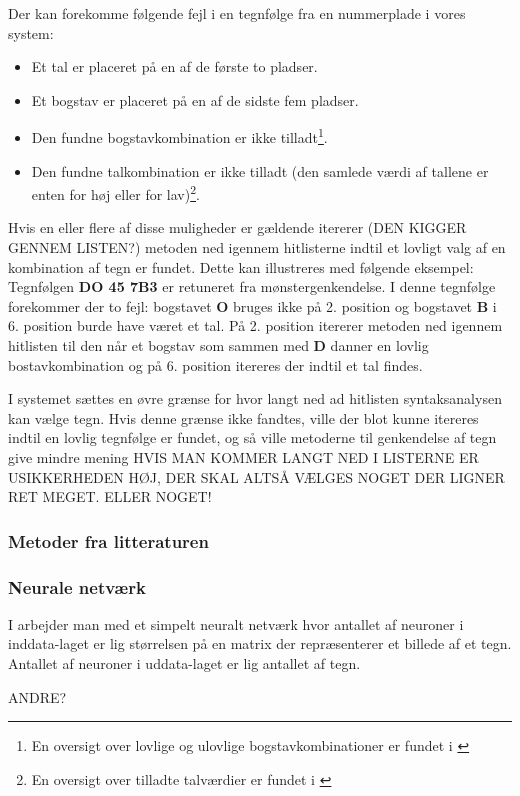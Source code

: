 Der kan forekomme følgende fejl i en tegnfølge fra en nummerplade i vores system:

\begin{itemize}
\item Et tal er placeret på en af de første to pladser.
\item Et bogstav er placeret på en af de sidste fem pladser.
\item Den fundne bogstavkombination er ikke tilladt\footnote{En oversigt over lovlige og ulovlige bogstavkombinationer er fundet i \cite{bogstav_komb}}.
\item Den fundne talkombination er ikke tilladt (den samlede værdi af tallene er enten for høj eller for lav)\footnote{En oversigt over tilladte talværdier er fundet i \cite{nrpl}}.
\end{itemize}

Hvis en eller flere af disse muligheder er gældende itererer (DEN KIGGER GENNEM LISTEN?) metoden ned igennem hitlisterne indtil et lovligt valg af en kombination af tegn er fundet. Dette kan illustreres med følgende eksempel: Tegnfølgen \textbf{DO 45 7B3} er retuneret fra mønstergenkendelse. I denne tegnfølge forekommer der to fejl: bogstavet \textbf{O} bruges ikke på 2. position og bogstavet \textbf{B} i 6. position burde have været et tal. På 2. position itererer metoden ned igennem hitlisten til den når et bogstav som sammen med \textbf{D} danner en lovlig bostavkombination og på 6. position itereres der indtil et tal findes.

I systemet sættes en øvre grænse for hvor langt ned ad hitlisten syntaksanalysen kan vælge tegn. Hvis denne grænse ikke fandtes, ville der blot kunne itereres indtil en lovlig tegnfølge er fundet, og så ville metoderne til genkendelse af tegn give mindre mening HVIS MAN KOMMER LANGT NED I LISTERNE ER USIKKERHEDEN HØJ, DER SKAL ALTSÅ VÆLGES NOGET DER LIGNER RET MEGET. ELLER NOGET!

\subsubsection{Metoder fra litteraturen}

\subsubsection*{Neurale netværk}
I \cite{kwas} arbejder man med et simpelt neuralt netværk hvor antallet af neuroner i inddata-laget er lig størrelsen på en matrix der repræsenterer et billede af et tegn. Antallet af neuroner i uddata-laget er lig antallet af tegn.

ANDRE?
